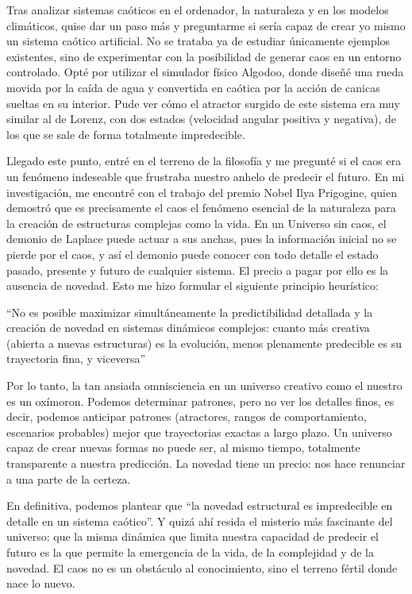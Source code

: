 \documentclass[
  11pt,
  a4paper,
  DIV=11,
  numbers=noendperiod]{scrreprt}
\begin{document}
Tras analizar sistemas caóticos en el ordenador, la naturaleza y en los
modelos climáticos, quise dar un paso más y preguntarme si sería capaz
de crear yo mismo un sistema caótico artificial. No se trataba ya de
estudiar únicamente ejemplos existentes, sino de experimentar con la
posibilidad de generar caos en un entorno controlado. Opté por utilizar
el simulador físico Algodoo, donde diseñé una rueda movida por la caída
de agua y convertida en caótica por la acción de canicas sueltas en su
interior. Pude ver cómo el atractor surgido de este sistema era muy
similar al de Lorenz, con dos estados (velocidad angular positiva y
negativa), de los que se sale de forma totalmente impredecible.

Llegado este punto, entré en el terreno de la filosofía y me pregunté si
el caos era un fenómeno indeseable que frustraba nuestro anhelo de
predecir el futuro. En mi investigación, me encontré con el trabajo del
premio Nobel Ilya Prigogine, quien demostró que es precisamente el caos
el fenómeno esencial de la naturaleza para la creación de estructuras
complejas como la vida. En un Universo sin caos, el demonio de Laplace
puede actuar a sus anchas, pues la información inicial no se pierde por
el caos, y así el demonio puede conocer con todo detalle el estado
pasado, presente y futuro de cualquier sistema. El precio a pagar por
ello es la ausencia de novedad. Esto me hizo formular el siguiente
principio heurístico:

``No es posible maximizar simultáneamente la predictibilidad detallada y
la creación de novedad en sistemas dinámicos complejos: cuanto más
creativa (abierta a nuevas estructuras) es la evolución, menos
plenamente predecible es su trayectoria fina, y viceversa''

Por lo tanto, la tan ansiada omnisciencia en un universo creativo como
el nuestro es un oxímoron. Podemos determinar patrones, pero no ver los
detalles finos, es decir, podemos anticipar patrones (atractores, rangos
de comportamiento, escenarios probables) mejor que trayectorias exactas
a largo plazo. Un universo capaz de crear nuevas formas no puede ser, al
mismo tiempo, totalmente transparente a nuestra predicción. La novedad
tiene un precio: nos hace renunciar a una parte de la certeza.

En definitiva, podemos plantear que ``la novedad estructural es
impredecible en detalle en un sistema caótico''. Y quizá ahí resida el
misterio más fascinante del universo: que la misma dinámica que limita
nuestra capacidad de predecir el futuro es la que permite la emergencia
de la vida, de la complejidad y de la novedad. El caos no es un
obstáculo al conocimiento, sino el terreno fértil donde nace lo nuevo.
\end{document}
